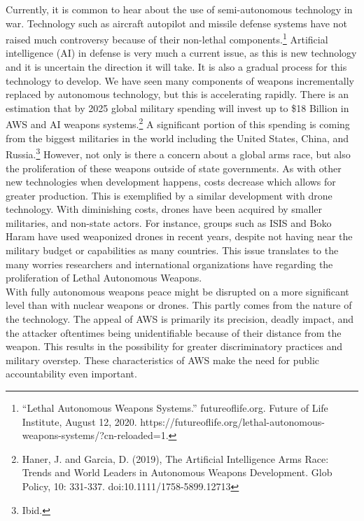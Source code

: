 \documentclass[10pt, letterpaper]{article}
\begin{document}
Currently, it is common to hear about the use of semi-autonomous
technology in war. Technology such as aircraft autopilot and missile
defense systems have not raised much controversy because of their
non-lethal components.\footnote{``Lethal Autonomous Weapons Systems.''
  futureoflife.org. Future of Life Institute, August 12, 2020.
  https://futureoflife.org/lethal-autonomous-weapons-systems/?cn-reloaded=1.}
Artificial intelligence (AI) in defense is very much a current issue, as
this is new technology and it is uncertain the direction it will take.
It is also a gradual process for this technology to develop. We have
seen many components of weapons incrementally replaced by autonomous
technology, but this is accelerating rapidly. There is an estimation
that by 2025 global military spending will invest up to \$18 Billion in
AWS and AI weapons systems.\footnote{Haner, J. and Garcia, D. (2019),
  The Artificial Intelligence Arms Race: Trends and World Leaders in
  Autonomous Weapons Development. Glob Policy, 10: 331-337.
  doi:10.1111/1758-5899.12713} A significant portion of this spending is
coming from the biggest militaries in the world including the United
States, China, and Russia.\footnote{Ibid.} However, not only is there a
concern about a global arms race, but also the proliferation of these
weapons outside of state governments. As with other new technologies
when development happens, costs decrease which allows for greater
production. This is exemplified by a similar development with drone
technology. With diminishing costs, drones have been acquired by smaller
militaries, and non-state actors. For instance, groups such as ISIS and
Boko Haram have used weaponized drones in recent years, despite not
having near the military budget or capabilities as many countries. This
issue translates to the many worries researchers and international
organizations have regarding the proliferation of Lethal Autonomous
Weapons. \\

With fully autonomous weapons peace might be disrupted on a more
significant level than with nuclear weapons or drones. This partly
comes from the nature of the technology. The appeal of AWS is primarily
its precision, deadly impact, and the attacker oftentimes being
unidentifiable because of their distance from the weapon. This results
in the possibility for greater discriminatory practices and military
overstep. These characteristics of AWS make the need for public
accountability even important. \\
\end{document}
